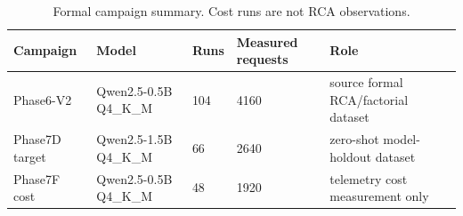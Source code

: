 \begin{table}[t]
\centering
\small
\caption{Formal campaign summary. Cost runs are not RCA observations.}
\begin{tabular}{lllll}
\hline
Campaign & Model & Runs & Measured requests & Role \\
\hline
Phase6-V2 & Qwen2.5-0.5B Q4\_K\_M & 104 & 4160 & source formal RCA/factorial dataset \\
Phase7D target & Qwen2.5-1.5B Q4\_K\_M & 66 & 2640 & zero-shot model-holdout dataset \\
Phase7F cost & Qwen2.5-0.5B Q4\_K\_M & 48 & 1920 & telemetry cost measurement only \\
\hline
\end{tabular}
\end{table}
